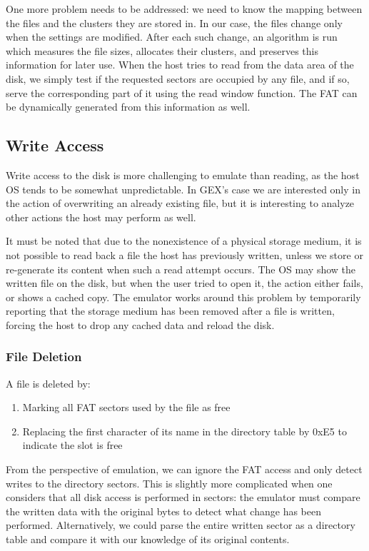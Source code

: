 One more problem needs to be addressed: we need to know the mapping between the files and the clusters they are stored in. In our case, the files change only when the settings are modified. After each such change, an algorithm is run which measures the file sizes, allocates their clusters, and preserves this information for later use. When the host tries to read from the data area of the disk, we simply test if the requested sectors are occupied by any file, and if so, serve the corresponding part of it using the read window function. The \gls{FAT} can be dynamically generated from this information as well.

\subsection{Write Access}

Write access to the disk is more challenging to emulate than reading, as the host OS tends to be somewhat unpredictable. In GEX's case we are interested only in the action of overwriting an already existing file, but it is interesting to analyze other actions the host may perform as well.

It must be noted that due to the nonexistence of a physical storage medium, it is not possible to read back a file the host has previously written, unless we store or re-generate its content when such a read attempt occurs. The \gls{OS} may show the written file on the disk, but when the user tried to open it, the action either fails, or shows a cached copy. The emulator works around this problem by temporarily reporting that the storage medium has been removed after a file is written, forcing the host to drop any cached data and reload the disk.

\subsubsection{File Deletion}

A file is deleted by:

\begin{enumerate}
	\item Marking all \gls{FAT} sectors used by the file as free
	\item Replacing the first character of its name in the directory table by 0xE5 to indicate the slot is free
\end{enumerate}

From the perspective of emulation, we can ignore the \gls{FAT} access and only detect writes to the directory sectors. This is slightly more complicated when one considers that all disk access is performed in sectors: the emulator must compare the written data with the original bytes to detect what change has been performed. Alternatively, we could parse the entire written sector as a directory table and compare it with our knowledge of its original contents.

